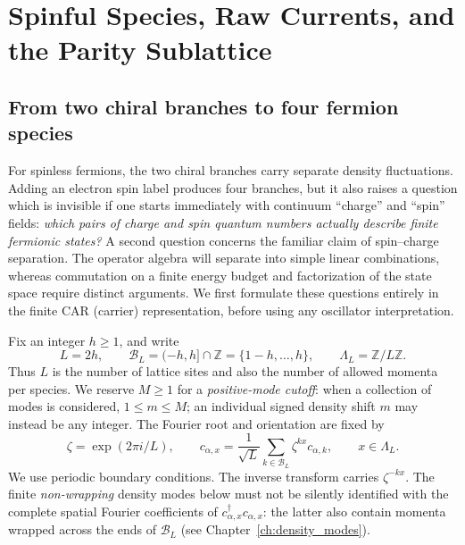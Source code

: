 \section{Spinful Species, Raw Currents, and the Parity Sublattice}
\label{sec:ch21-spin-charge}

\subsection*{From two chiral branches to four fermion species}

For spinless fermions, the two chiral branches carry separate density
fluctuations.  Adding an electron spin label produces four branches, but it
also raises a question which is invisible if one starts immediately with
continuum ``charge'' and ``spin'' fields: \emph{which pairs of charge and spin
quantum numbers actually describe finite fermionic states?}  A second question
concerns the familiar claim of spin--charge separation.  The operator algebra
will separate into simple linear combinations, whereas commutation on a
finite energy budget and factorization of the state space require distinct
arguments.  We first formulate these questions entirely in the finite CAR
(carrier) representation, before using any oscillator interpretation.

Fix an integer $h\geq 1$, and write
\begin{equation}
  L=2h,\qquad
  \mathcal B_L=(-h,h]\cap\mathbb Z=\{1-h,\ldots,h\},\qquad
  \Lambda_L=\mathbb Z/L\mathbb Z.
  \label{eq:ch21-finite-band}
\end{equation}
Thus $L$ is the number of lattice sites and also the number of allowed
momenta per species.  We reserve $M\geq 1$ for a \emph{positive-mode cutoff}:
when a collection of modes is considered, $1\leq m\leq M$; an individual
signed density shift $m$ may instead be any integer.  The Fourier root and
orientation are fixed by
\begin{equation}
  \zeta=\exp(2\pi i/L),\qquad
  c_{\alpha,x}=\frac{1}{\sqrt L}
     \sum_{k\in\mathcal B_L}\zeta^{kx}c_{\alpha,k},
  \qquad x\in\Lambda_L.
  \label{eq:ch21-fourier-orientation}
\end{equation}
We use periodic boundary conditions.  The inverse transform carries
$\zeta^{-kx}$.  The finite \emph{non-wrapping} density modes below must not be
silently identified with the complete spatial Fourier coefficients of
$c_{\alpha,x}^{\dagger}c_{\alpha,x}$: the latter also contain momenta
wrapped across the ends of $\mathcal B_L$ (see Chapter~\ref{ch:density_modes}).

